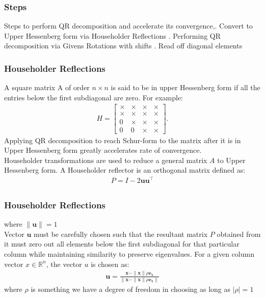 \documentclass{beamer}
\theoremstyle{remark}
\providecommand{\abs}[1]{\left\vert#1\right\vert}
\numberwithin{equation}{section}
\begin{document}
    \begin{frame}[fragile]
      \frametitle{Steps}
      Steps to perform QR decomposition and accelerate its convergence,. Convert to Upper Hessenberg form via Householder Reflections . Performing QR decomposition via Givens Rotations with shifts . Read off diagonal elements
    \end{frame}
    \begin{frame}
      \frametitle{Householder Reflections}
      A square matrix A of order $n \times n$ is said to be in upper Hessenberg form if all the entries below the first subdiagonal are zero.
      For example:
      {\small
      \begin{align}
        H = \begin{bmatrix}
          \times & \times & \times & \times \\
          \times & \times & \times & \times \\
          0 & \times & \times & \times \\
          0 & 0 & \times & \times
        \end{bmatrix}.
      \end{align}
      }
      Applying QR decomposition to reach Schur-form to the matrix after it is in Upper Hessenberg form greatly accelerates rate of convergence.\\
      Householder transformations are used to reduce a general matrix $A$ to Upper Hessenberg form. A Householder reflector is an orthogonal matrix defined as:
      \begin{align}
        P = I - 2\textbf{uu}^{\top} \\
      \end{align}
    \end{frame}
    \begin{frame}
      \frametitle{Householder Reflections}
      where $\|\textbf{u}\|=1$\\    
      Vector $\textbf{u}$ must be carefully chosen such that the resultant matrix $P$ obtained from it must zero out all elements below the first subdiagonal for that particular column while maintaining similarity to preserve eigenvalues.\newline
      For a given column vector $x \in \mathbb{R}^n$, the vector $u$ is chosen as:
      \begin{align}
        \mathbf{u} = \frac{\mathbf{x} - \|\mathbf{x}\| \rho \mathbf{e_1}}{\|\mathbf{x} - \|\mathbf{x}\| \rho \mathbf{e_1}\|}
      \end{align}
    where $\rho$ is something we have a degree of freedom in choosing as long as $\abs{\rho}=1$
    \end{frame}
\end{document}
